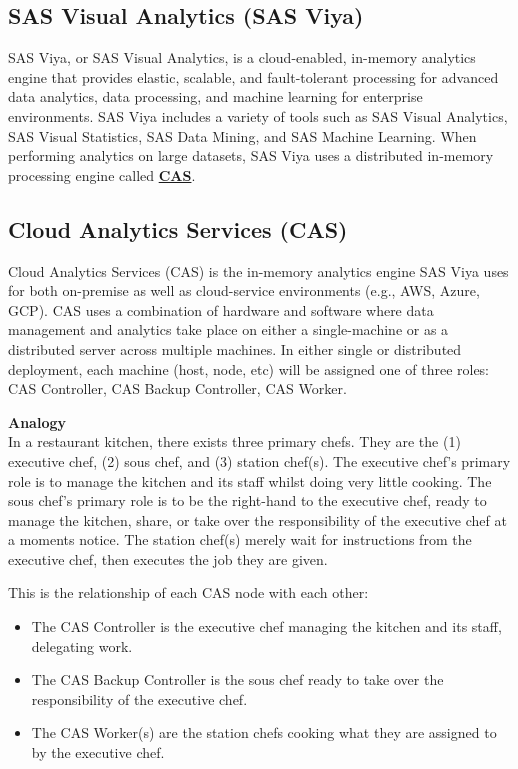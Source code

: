 \subsection{SAS Visual Analytics (SAS Viya)}
SAS Viya, or SAS Visual Analytics, is a cloud-enabled, in-memory analytics engine that provides elastic, scalable, and fault-tolerant processing for advanced data analytics, data processing, and machine learning for enterprise environments. SAS Viya includes a variety of tools such as SAS Visual Analytics, SAS Visual Statistics, SAS Data Mining, and SAS Machine Learning. When performing analytics on large datasets, SAS Viya uses a distributed in-memory processing engine called \href{https://documentation.sas.com/doc/en/calcdc/3.3/calserverscas/n05000viyaservers000000admin.htm}{\textbf{CAS}}.

\subsection{Cloud Analytics Services (CAS)}
Cloud Analytics Services (CAS) is the in-memory analytics engine SAS Viya uses for both on-premise as well as cloud-service environments (e.g., AWS, Azure, GCP). CAS uses a combination of hardware and software where data management and analytics take place on either a single-machine or as a distributed server across multiple machines. In either single or distributed deployment, each machine (host, node, etc) will be assigned one of three roles: CAS Controller, CAS Backup Controller, CAS Worker.

\textbf{Analogy}
\\
In a restaurant kitchen, there exists three primary chefs. They are the (1) executive chef, (2) sous chef, and (3) station chef(s). The executive chef's primary role is to manage the kitchen and its staff whilst doing very little cooking. The sous chef's primary role is to be the right-hand to the executive chef, ready to manage the kitchen, share, or take over the responsibility of the executive chef at a moments notice. The station chef(s) merely wait for instructions from the executive chef, then executes the job they are given. 

This is the relationship of each CAS node with each other:
\begin{itemize}
    \item The CAS Controller is the executive chef managing the kitchen and its staff, delegating work.
    \item The CAS Backup Controller is the sous chef ready to take over the responsibility of the executive chef. 
    \item The CAS Worker(s) are the station chefs cooking what they are assigned to by the executive chef. 
\end{itemize}


